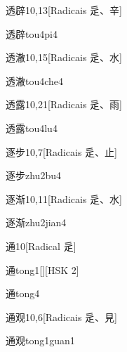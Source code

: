 \begin{entry}{透辟}{10,13}[Radicais ⾡、⾟]
  \begin{phonetics}{透辟}{tou4pi4}
  \end{phonetics}
\end{entry}

\begin{entry}{透澈}{10,15}[Radicais ⾡、⽔]
  \begin{phonetics}{透澈}{tou4che4}
  \end{phonetics}
\end{entry}

\begin{entry}{透露}{10,21}[Radicais ⾡、⾬]
  \begin{phonetics}{透露}{tou4lu4}
  \end{phonetics}
\end{entry}

\begin{entry}{逐步}{10,7}[Radicais ⾡、⽌]
  \begin{phonetics}{逐步}{zhu2bu4}
  \end{phonetics}
\end{entry}

\begin{entry}{逐渐}{10,11}[Radicais ⾡、⽔]
  \begin{phonetics}{逐渐}{zhu2jian4}
  \end{phonetics}
\end{entry}

\begin{entry}{通}{10}[Radical ⾡]
  \begin{phonetics}{通}{tong1}[][HSK 2]
  \end{phonetics}
  \begin{phonetics}{通}{tong4}
  \end{phonetics}
\end{entry}

\begin{entry}{通观}{10,6}[Radicais ⾡、⾒]
  \begin{phonetics}{通观}{tong1guan1}
  \end{phonetics}
\end{entry}

